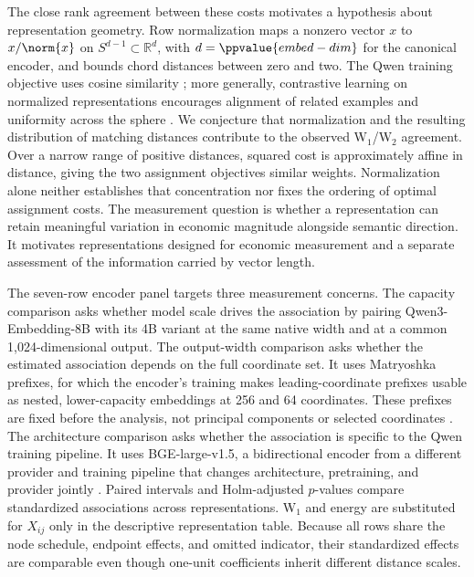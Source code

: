 The close rank agreement between these costs motivates a hypothesis about
representation geometry.
Row normalization maps a nonzero vector $x$ to $x/\norm{x}$ on
$S^{d-1}\subset\mathbb R^d$, with $d=\ppvalue{embed-dim}$ for the canonical
encoder, and bounds chord distances between zero and two.
The Qwen training objective uses cosine similarity
\citep{qwen3_embedding_2025}; more generally, contrastive learning on
normalized representations encourages alignment of related examples and
uniformity across the sphere \citep{wang_isola_hypersphere_2020}.
We conjecture that normalization and the resulting distribution of matching
distances contribute to the observed W$_1$/W$_2$ agreement.
Over a narrow range of positive distances, squared cost is approximately
affine in distance, giving the two assignment objectives similar weights.
Normalization alone neither establishes that concentration nor fixes the
ordering of optimal assignment costs.
The measurement question is whether a representation can retain meaningful
variation in economic magnitude alongside semantic direction.
It motivates representations designed for economic measurement and a
separate assessment of the information carried by vector length.

The seven-row encoder panel targets three measurement concerns.
The capacity comparison asks whether model scale drives the association by
pairing Qwen3-Embedding-8B with its 4B variant at the same native width and
at a common 1,024-dimensional output.
The output-width comparison asks whether the estimated association depends on
the full coordinate set.
It uses Matryoshka prefixes, for which the encoder's training makes
leading-coordinate prefixes usable as nested, lower-capacity embeddings at
256 and 64 coordinates.
These prefixes are fixed before the analysis, not principal components or
selected coordinates \citep{kusupati_matryoshka_2022}.
The architecture comparison asks whether the association is specific to the
Qwen training pipeline.
It uses BGE-large-v1.5, a bidirectional encoder from a different provider and
training pipeline that changes architecture, pretraining, and provider
jointly \citep{xiao_cpack_2023}.
Paired intervals and Holm-adjusted $p$-values compare standardized
associations across representations.
W$_1$ and energy are substituted for $X_{ij}$ only in the descriptive
representation table.
Because all rows share the node schedule, endpoint effects, and omitted
indicator, their standardized effects are comparable even though one-unit
coefficients inherit different distance scales.

